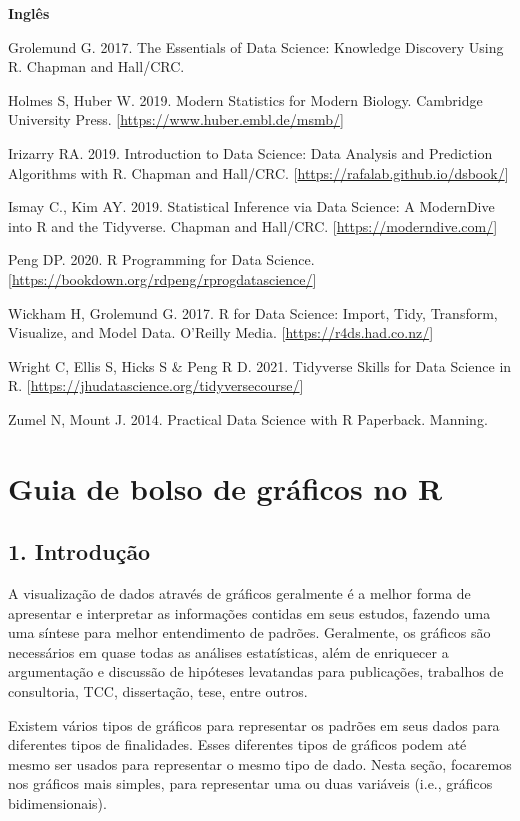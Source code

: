\documentclass[
]{book}
\begin{document}
\textbf{Inglês}

Grolemund G. 2017. The Essentials of Data Science: Knowledge Discovery Using R. Chapman and Hall/CRC.

Holmes S, Huber W. 2019. Modern Statistics for Modern Biology. Cambridge University Press. {[}\url{https://www.huber.embl.de/msmb/}{]}

Irizarry RA. 2019. Introduction to Data Science: Data Analysis and Prediction Algorithms with R. Chapman and Hall/CRC. {[}\url{https://rafalab.github.io/dsbook/}{]}

Ismay C., Kim AY. 2019. Statistical Inference via Data Science: A ModernDive into R and the Tidyverse. Chapman and Hall/CRC. {[}\url{https://moderndive.com/}{]}

Peng DP. 2020. R Programming for Data Science. {[}\url{https://bookdown.org/rdpeng/rprogdatascience/}{]}

Wickham H, Grolemund G. 2017. R for Data Science: Import, Tidy, Transform, Visualize, and Model Data. O'Reilly Media. {[}\url{https://r4ds.had.co.nz/}{]}

Wright C, Ellis S, Hicks S \& Peng R D. 2021. Tidyverse Skills for Data Science in R. {[}\url{https://jhudatascience.org/tidyversecourse/}{]}

Zumel N, Mount J. 2014. Practical Data Science with R Paperback. Manning.

\hypertarget{cap6}{%
\chapter{Guia de bolso de gráficos no R}\label{cap6}}

\hypertarget{introduuxe7uxe3o-2}{%
\section{1. Introdução}\label{introduuxe7uxe3o-2}}

A visualização de dados através de gráficos geralmente é a melhor forma de apresentar e interpretar as informações contidas em seus estudos, fazendo uma uma síntese para melhor entendimento de padrões. Geralmente, os gráficos são necessários em quase todas as análises estatísticas, além de enriquecer a argumentação e discussão de hipóteses levatandas para publicações, trabalhos de consultoria, TCC, dissertação, tese, entre outros.

Existem vários tipos de gráficos para representar os padrões em seus dados para diferentes tipos de finalidades. Esses diferentes tipos de gráficos podem até mesmo ser usados para representar o mesmo tipo de dado. Nesta seção, focaremos nos gráficos mais simples, para representar uma ou duas variáveis (i.e., gráficos bidimensionais).
\end{document}
